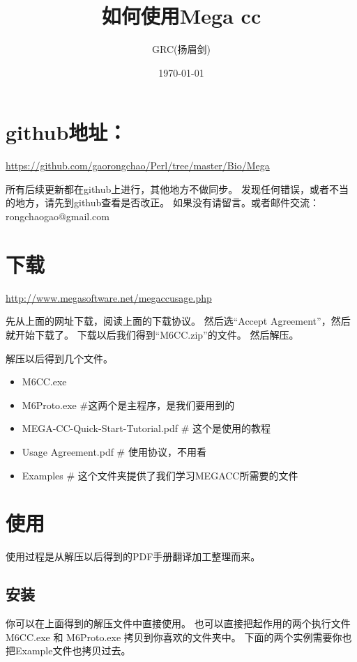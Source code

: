 \documentclass{ctexart}
\title{如何使用Mega cc}
\author{GRC(扬眉剑)}
\date{\today}
\begin{document}
\maketitle

\setcounter{tocdepth}{3}
\tableofcontents
\vspace*{1cm}
 
\section{github地址：}
\label{sec-1}

\href{https://github.com/gaorongchao/Perl/tree/master/Bio/Mega}{https://github.com/gaorongchao/Perl/tree/master/Bio/Mega}

所有后续更新都在github上进行，其他地方不做同步。
发现任何错误，或者不当的地方，请先到github查看是否改正。
如果没有请留言。或者邮件交流：rongchaogao@gmail.com
\section{下载}
\label{sec-2}

\href{http://www.megasoftware.net/megaccusage.php}{http://www.megasoftware.net/megaccusage.php}

先从上面的网址下载，阅读上面的下载协议。
然后选“Accept Agreement”，然后就开始下载了。
下载以后我们得到“M6CC.zip”的文件。
然后解压。

解压以后得到几个文件。
\begin{itemize}
\item M6CC.exe
\item M6Proto.exe \#这两个是主程序，是我们要用到的
\item MEGA-CC-Quick-Start-Tutorial.pdf \# 这个是使用的教程
\item Usage Agreement.pdf \# 使用协议，不用看
\item Examples \# 这个文件夹提供了我们学习MEGACC所需要的文件
\end{itemize}
\section{使用}
\label{sec-3}

使用过程是从解压以后得到的PDF手册翻译加工整理而来。
\subsection{安装}
\label{sec-3-1}

你可以在上面得到的解压文件中直接使用。
也可以直接把起作用的两个执行文件M6CC.exe 和 M6Proto.exe
拷贝到你喜欢的文件夹中。
下面的两个实例需要你也把Example文件也拷贝过去。
\end{document}
